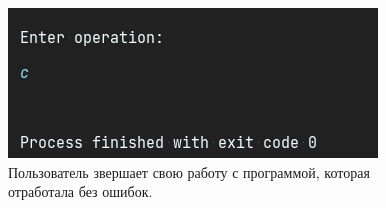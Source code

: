 \documentclass[a4paper,14pt]{article}
\begin{document}
\begin{figure}
  \centering
  \captionsetup{justification=centering,margin=1cm}
  \includegraphics[width=\linewidth]{pictures/7}
  \caption{Пользователь звершает свою работу с программой, которая отработала без ошибок.}
\end{figure}
\begin{figure}[H]
  \centering
  \captionsetup{justification=centering,margin=1cm}

\end{figure}
\end{document}
